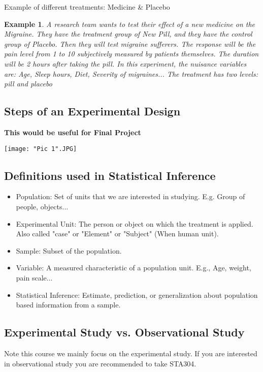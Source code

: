 \documentclass[a4paper,11pt]{article}
\newtheorem{eg}[thm]{Example}
\begin{document}
Example of different treatments: Medicine \& Placebo
\begin{eg}
\normalfont
A research team wants to test their effect of a new medicine on the Migraine. They have the treatment group of New Pill, and they have the control group of Placebo. Then they will test migraine sufferers. The response will be the pain level from 1 to 10 subjectively measured by patients themselves. The duration will be 2 hours after taking the pill. In this experiment, the nuisance variables are: Age, Sleep hours, Diet, Severity of migraines... The treatment has two levels: pill and placebo
\end{eg}
\newpage
\subsection{Steps of an Experimental Design}
\textbf{This would be useful for Final Project}

\begin{center}
	\texttt{[image: "Pic 1".JPG]}
\end{center}

\subsection{Definitions used in Statistical Inference}
\begin{itemize}
\item Population: Set of units that we are interested in studying. E.g. Group of people, objects...
\item Experimental Unit: The person or object on which the treatment is applied. Also called "case" or "Element" or "Subject" (When human unit). 
\item Sample: Subset of the population.
\item Variable: A measured characteristic of a population unit. E.g., Age, weight, pain scale... 
\item Statistical Inference: Estimate, prediction, or generalization about population based information from a sample. 
\end{itemize}

\subsection{Experimental Study vs. Observational Study}
Note this course we mainly focus on the experimental study. If you are interested in observational study you are recommended to take STA304. 
\end{document}
